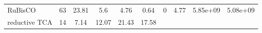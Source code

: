 \documentclass[]{article}
\begin{document}
\begin{longtable}[]{@{}lccccccccc@{}}
\begin{minipage}[t]{0.07\columnwidth}
RuBisCO\strut
\end{minipage} & \begin{minipage}[t]{0.06\columnwidth}\centering\strut
63\strut
\end{minipage} & \begin{minipage}[t]{0.08\columnwidth}\centering\strut
23.81\strut
\end{minipage} & \begin{minipage}[t]{0.08\columnwidth}\centering\strut
5.6\strut
\end{minipage} & \begin{minipage}[t]{0.08\columnwidth}\centering\strut
4.76\strut
\end{minipage} & \begin{minipage}[t]{0.08\columnwidth}\centering\strut
0.64\strut
\end{minipage} & \begin{minipage}[t]{0.08\columnwidth}\centering\strut
0\strut
\end{minipage} & \begin{minipage}[t]{0.08\columnwidth}\centering\strut
4.77\strut
\end{minipage} & \begin{minipage}[t]{0.08\columnwidth}\centering\strut
5.85e+09\strut
\end{minipage} & \begin{minipage}[t]{0.08\columnwidth}\centering\strut
5.08e+09\strut
\end{minipage}\tabularnewline
\begin{minipage}[t]{0.07\columnwidth}\raggedright\strut
reductive TCA\strut
\end{minipage} & \begin{minipage}[t]{0.06\columnwidth}\centering\strut
14\strut
\end{minipage} & \begin{minipage}[t]{0.08\columnwidth}\centering\strut
7.14\strut
\end{minipage} & \begin{minipage}[t]{0.08\columnwidth}\centering\strut
12.07\strut
\end{minipage} & \begin{minipage}[t]{0.08\columnwidth}\centering\strut
21.43\strut
\end{minipage} & \begin{minipage}[t]{0.08\columnwidth}\centering\strut
17.58\strut
\end{minipage} & \begin{minipage}[t]{0.08\columnwidth}\centering\strut

\end{minipage}
\end{longtable}
\end{document}
